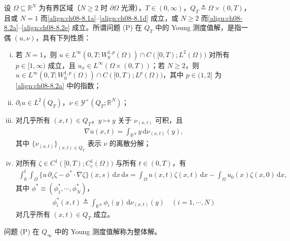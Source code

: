 \documentclass[../../main.tex]{subfiles}%
\begin{document}
\begin{definition}\label{definition:ch08-Young测度值解}
设 $\Omega\subseteq\mathbb{R}^N$ 为有界区域（$N\geqslant2$ 时 $\partial\Omega$ 光滑），$T\in(0,\infty)$，$Q_T\triangleq\Omega\times(0,T)$，且或 $N=1$ 而\eqref{align:ch08-8.1a}--\eqref{align:ch08-8.1d} 成立，或 $N\geqslant2$ 而\eqref{align:ch08-8.2a}--\eqref{align:ch08-8.2e} 成立。所谓问题 (P) 在 $Q_T$ 中的 Young 测度值解，是指一偶 $(u,\nu)$，具有下列性质：
\begin{enumerate}[(i)]
\item\label{item:ch08-ymvs-i} 若 $N=1$，则 $u\in L^\infty(0,T;W^{1,p}_0(\Omega))\cap C([0,T);L^2(\Omega))$ 对所有 $p\in[1,\infty)$ 成立，且 $u_x\in L^\infty(\Omega\times(0,T))$；若 $N\geqslant2$，则 $u\in L^\infty(0,T;W^{1,p}_0(\Omega))\cap C([0,T);L^p(\Omega))$，其中 $p\in(1,2]$ 为\eqref{align:ch08-8.2a} 中的指数；
\item\label{item:ch08-ymvs-ii} $\partial_t u\in L^2(Q_T)$，$\nu\in\mathcal{Y}^+(Q_T;\mathbb{R}^N)$；
\item\label{item:ch08-ymvs-iii} 对几乎所有 $(x,t)\in Q_T$，$y\mapsto y$ 关于 $\nu_{(x,t)}$ 可积，且
\begin{align}
\nabla u(x,t)=\int_{\mathbb{R}^N}y\,\mathrm{d}\nu_{(x,t)}(y), \label{align:ch08-8.4}
\end{align}
其中 $\{\nu_{(x,t)}\}_{(x,t)\in Q_T}$ 表示 $\nu$ 的离散分解；
\item\label{item:ch08-ymvs-iv} 对所有 $\zeta\in C^1([0,T);C^1_c(\Omega))$ 与所有 $t\in(0,T)$，有
\begin{align}
\int_0^t\int_\Omega\{u\,\partial_s\zeta-\phi^*\cdot\nabla\zeta\}(x,s)\,\mathrm{d}x\,\mathrm{d}s
=\int_\Omega u(x,t)\zeta(x,t)\,\mathrm{d}x-\int_\Omega u_0(x)\zeta(x,0)\,\mathrm{d}x, \label{align:ch08-8.5}
\end{align}
其中 $\phi^*\equiv(\phi^*_1,\cdots ,\phi^*_N)$，
\begin{align}
\phi^*_i(x,t)\triangleq \int_{\mathbb{R}^N}\phi_i(y)\,\mathrm{d}\nu_{(x,t)}(y)\quad(i=1,\cdots ,N) \label{align:ch08-8.6}
\end{align}
对几乎所有 $(x,t)\in Q_T$ 成立。
\end{enumerate}
\end{definition}

问题 (P) 在 $Q_\infty$ 中的 Young 测度值解称为整体解。
\end{document}

